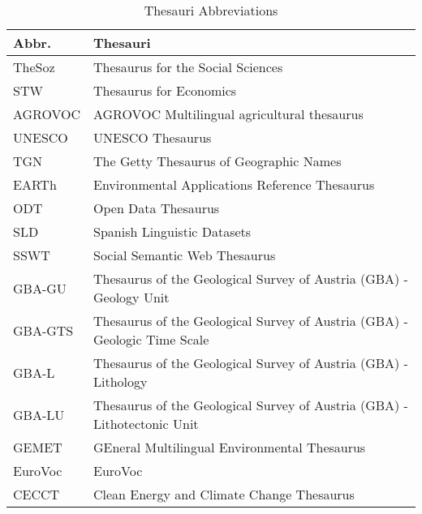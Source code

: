 \documentclass{llncs}
\begin{document}
\begin{table}[H]
	\centering
		\begin{tabular}{l|l}
      \textbf{Abbr.} & \textbf{Thesauri} \\		
      \hline
    TheSoz & Thesaurus for the Social Sciences\tablefootnote{\url{http://www.ecb.europa.eu/home/html/index.en.html}} \\
	  STW & Thesaurus for Economics\tablefootnote{\url{http://zbw.eu/stw/versions/latest/about}} \\
	  AGROVOC & AGROVOC Multilingual agricultural thesaurus\tablefootnote{\url{http://202.45.139.84:10035/catalogs/fao/repositories/agrovoc}} \\
		UNESCO & UNESCO Thesaurus\tablefootnote{\url{http://skos.um.es/sparql/}} \\
		TGN & The Getty Thesaurus of Geographic Names\tablefootnote{\url{http://vocab.getty.edu/sparql}} \\
		EARTh & Environmental Applications Reference Thesaurus\tablefootnote{\url{http://linkeddata.ge.imati.cnr.it/resource/EARTh/}} \\
		ODT & Open Data Thesaurus\tablefootnote{\url{http://vocabulary.semantic-web.at/PoolParty/wiki/OpenData}} \\
		SLD & Spanish Linguistic Datasets\tablefootnote{\url{http://linguistic.linkeddata.es}} \\
		SSWT & Social Semantic Web Thesaurus\tablefootnote{\url{http://vocabulary.semantic-web.at/PoolParty/wiki/semweb}} \\
		GBA-GU & Thesaurus of the Geological Survey of Austria (GBA) - Geology Unit\tablefootnote{\url{http://resource.geolba.ac.at/}} \\
		GBA-GTS & Thesaurus of the Geological Survey of Austria (GBA) - Geologic Time Scale\tablefootnote{\url{http://resource.geolba.ac.at/}} \\
		GBA-L & Thesaurus of the Geological Survey of Austria (GBA) - Lithology\tablefootnote{\url{http://resource.geolba.ac.at/}} \\
		GBA-LU & Thesaurus of the Geological Survey of Austria (GBA) - Lithotectonic Unit\tablefootnote{\url{http://resource.geolba.ac.at/}} \\
		GEMET & GEneral Multilingual Environmental Thesaurus\tablefootnote{\url{http://www.eionet.europa.eu/gemet/}} \\
		EuroVoc & EuroVoc\tablefootnote{\url{http://open-data.europa.eu/de/data/dataset/eurovoc}} \\
		CECCT & Clean Energy and Climate Change Thesaurus\tablefootnote{\url{http://data.reegle.info/thesaurus/guide}} \\
		\end{tabular}
	\caption{Thesauri Abbreviations}
	\label{tab:thesauri-abbreviations}
\end{table}
\end{document}

